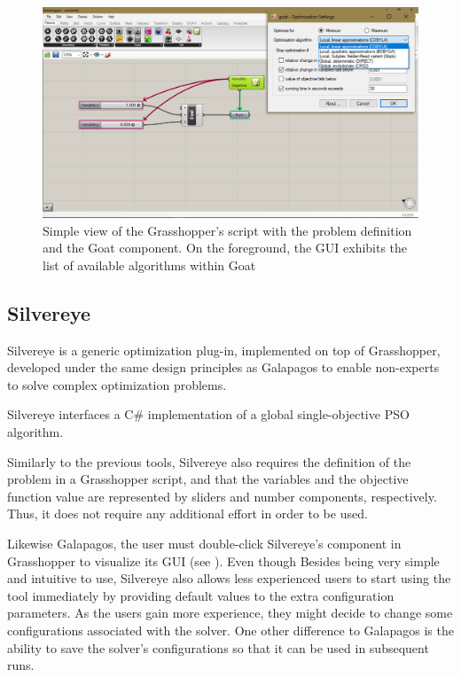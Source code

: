 	\begin{figure}
		\centering
		\includegraphics[width=1\textwidth]{Images/Background/Goat/general-view.png}
		\caption[Goat GUI]{Simple view of the Grasshopper's script with the problem definition and the Goat component. On the foreground, the \ac{GUI} exhibits the list of available algorithms within Goat}
		\label{fig:goat}
	\end{figure}
	
	
	\subsection{Silvereye}
	Silvereye \cite{Cichocka2017SILVEREYE} is a generic optimization plug-in, implemented on top of Grasshopper, developed under the same design principles as Galapagos to enable non-experts to solve complex optimization problems. 
	
	Silvereye interfaces a C\# implementation of a global single-objective \ac{PSO} algorithm.
	
	Similarly to the previous tools, Silvereye also requires the definition of the problem in a Grasshopper script, and that the variables and the objective function value are represented by sliders and number components, respectively. Thus, it does not require any additional effort in order to be used.
	
	Likewise Galapagos, the user must double-click Silvereye's component in Grasshopper to visualize its \ac{GUI} (see ). Even though Besides being very simple and intuitive to use, Silvereye also allows less experienced users to start using the tool immediately by providing default values to the extra configuration parameters. As the users gain more experience, they might decide to change some configurations associated with the solver. One other difference to Galapagos is the ability to save the solver's configurations so that it can be used in subsequent runs.
	
